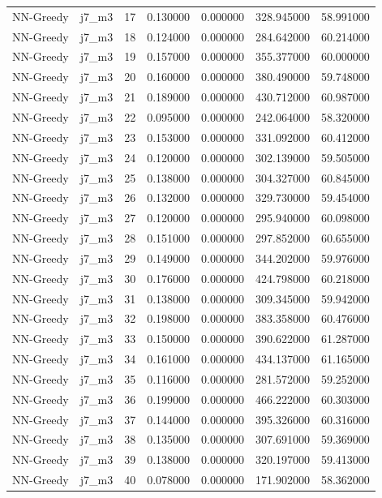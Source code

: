 \begin{tabular}{llrrrrr}
NN-Greedy & j7_m3 & 17 & 0.130000 & 0.000000 & 328.945000 & 58.991000 \\
NN-Greedy & j7_m3 & 18 & 0.124000 & 0.000000 & 284.642000 & 60.214000 \\
NN-Greedy & j7_m3 & 19 & 0.157000 & 0.000000 & 355.377000 & 60.000000 \\
NN-Greedy & j7_m3 & 20 & 0.160000 & 0.000000 & 380.490000 & 59.748000 \\
NN-Greedy & j7_m3 & 21 & 0.189000 & 0.000000 & 430.712000 & 60.987000 \\
NN-Greedy & j7_m3 & 22 & 0.095000 & 0.000000 & 242.064000 & 58.320000 \\
NN-Greedy & j7_m3 & 23 & 0.153000 & 0.000000 & 331.092000 & 60.412000 \\
NN-Greedy & j7_m3 & 24 & 0.120000 & 0.000000 & 302.139000 & 59.505000 \\
NN-Greedy & j7_m3 & 25 & 0.138000 & 0.000000 & 304.327000 & 60.845000 \\
NN-Greedy & j7_m3 & 26 & 0.132000 & 0.000000 & 329.730000 & 59.454000 \\
NN-Greedy & j7_m3 & 27 & 0.120000 & 0.000000 & 295.940000 & 60.098000 \\
NN-Greedy & j7_m3 & 28 & 0.151000 & 0.000000 & 297.852000 & 60.655000 \\
NN-Greedy & j7_m3 & 29 & 0.149000 & 0.000000 & 344.202000 & 59.976000 \\
NN-Greedy & j7_m3 & 30 & 0.176000 & 0.000000 & 424.798000 & 60.218000 \\
NN-Greedy & j7_m3 & 31 & 0.138000 & 0.000000 & 309.345000 & 59.942000 \\
NN-Greedy & j7_m3 & 32 & 0.198000 & 0.000000 & 383.358000 & 60.476000 \\
NN-Greedy & j7_m3 & 33 & 0.150000 & 0.000000 & 390.622000 & 61.287000 \\
NN-Greedy & j7_m3 & 34 & 0.161000 & 0.000000 & 434.137000 & 61.165000 \\
NN-Greedy & j7_m3 & 35 & 0.116000 & 0.000000 & 281.572000 & 59.252000 \\
NN-Greedy & j7_m3 & 36 & 0.199000 & 0.000000 & 466.222000 & 60.303000 \\
NN-Greedy & j7_m3 & 37 & 0.144000 & 0.000000 & 395.326000 & 60.316000 \\
NN-Greedy & j7_m3 & 38 & 0.135000 & 0.000000 & 307.691000 & 59.369000 \\
NN-Greedy & j7_m3 & 39 & 0.138000 & 0.000000 & 320.197000 & 59.413000 \\
NN-Greedy & j7_m3 & 40 & 0.078000 & 0.000000 & 171.902000 & 58.362000 \\

\end{tabular}

